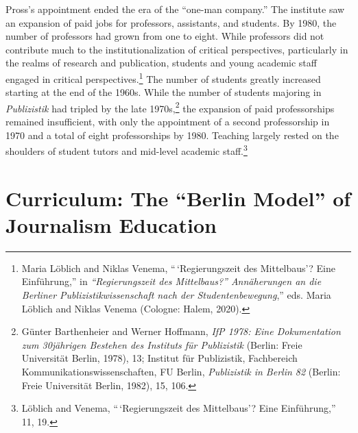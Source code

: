 \documentclass{tufte-handout}
\begin{document}
Pross's appointment ended the era of the ``one-man company.'' The
institute saw an expansion of paid jobs for professors, assistants, and
students. By 1980, the number of professors had grown from one to eight.
While professors did not contribute much to the institutionalization of
critical perspectives, particularly in the realms of research and
publication, students and young academic staff engaged in critical
perspectives.\footnote{Maria Löblich and Niklas Venema,
  ``\,`Regierungszeit des Mittelbaus'? Eine Einführung,'' in
  \emph{``Regierungszeit des Mittelbaus?'' Annäherungen an die Berliner
  Publizistikwissenschaft nach der Studentenbewegung},'' eds. Maria
  Löblich and Niklas Venema (Cologne: Halem, 2020).} The number of
students greatly increased starting at the end of the 1960s. While the
number of students majoring in \emph{Publizistik} had tripled by the
late 1970s,\footnote{Günter Barthenheier and Werner Hoffmann, \emph{IfP
  1978: Eine Dokumentation zum 30jährigen Bestehen des Instituts für
  Publizistik} (Berlin: Freie Universität Berlin, 1978), 13; Institut
  für Publizistik, Fachbereich Kommunikationswissenschaften, FU Berlin,
  \emph{Publizistik in Berlin 82} (Berlin: Freie Universität Berlin,
  1982), 15, 106.} the expansion of paid professorships remained
insufficient, with only the appointment of a second professorship in
1970 and a total of eight professorships by 1980. Teaching largely
rested on the shoulders of student tutors and mid-level academic
staff.\footnote{Löblich and Venema, ``\,`Regierungszeit des Mittelbaus'?
  Eine Einführung,'' 11, 19.}

\hypertarget{curriculum-the-berlin-model-of-journalism-education}{%
\section{Curriculum: The ``Berlin Model'' of Journalism
Education}\label{curriculum-the-berlin-model-of-journalism-education}}
\end{document}
